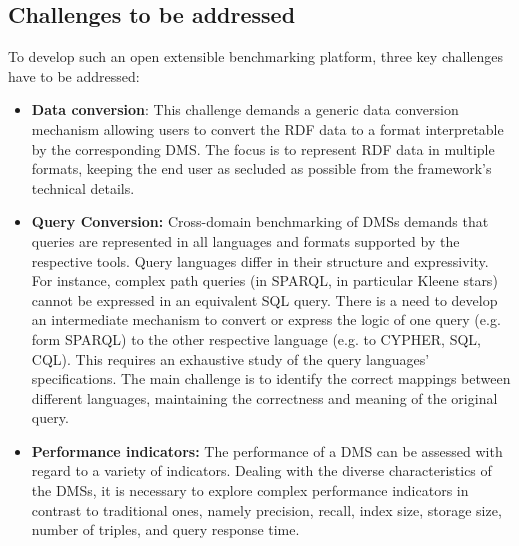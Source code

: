 \documentclass{llncs}
\begin{document}
    \subsection{Challenges to be addressed}\label{challenges}
        To develop such an open extensible benchmarking platform, three key challenges have to be addressed:
        \begin{itemize}[nosep]
            \item {} \textbf{Data conversion}: This challenge demands a generic data conversion mechanism allowing users to convert the RDF data to a format interpretable by the corresponding DMS.
            The focus is to represent RDF data in multiple formats, keeping the end user as secluded as possible from the framework's technical details. 
            \item {} \textbf{Query Conversion:} 
            Cross-domain benchmarking of DMSs demands that queries are represented in all languages and formats supported by the respective tools.
            Query languages differ in their structure and expressivity. %
            For instance, complex path queries (in SPARQL, in particular Kleene stars) cannot be expressed in an equivalent SQL query.
            There is a need to develop an intermediate mechanism to convert or express the logic of one query (e.g. form SPARQL) to the other respective language (e.g. to CYPHER, SQL, CQL).
            This requires an exhaustive study of the query languages' specifications.
            The main challenge is to identify the correct mappings between different languages, maintaining the correctness and meaning of the original query.
            \item {} \textbf{Performance indicators:} 
            The performance of a DMS can be assessed with regard to a variety of indicators.
            Dealing with the diverse characteristics of the DMSs, it is necessary to explore complex performance indicators in contrast to traditional ones, namely precision, recall, index size, storage size, number of triples, and query response time.
        \end{itemize}
    
\end{document}
